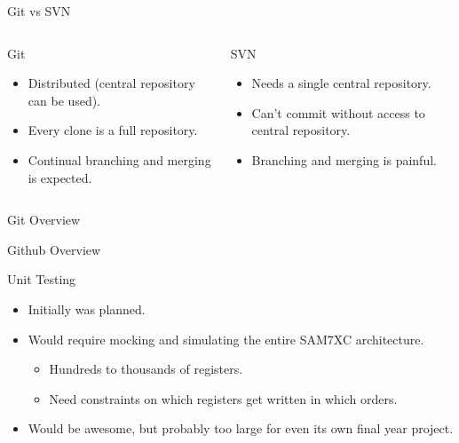 \documentclass[xcolor=dvipsnames]{beamer}
\begin{document}
    \begin{frame}{Git vs SVN}
      \begin{columns}
          \begin{block}{Git}
            \begin{itemize}
              \item Distributed (central repository can be used).
              \vspace{0.5\baselineskip}
              \item Every clone is a full repository.
              \vspace{0.5\baselineskip}
              \item Continual branching and merging is expected.
            \end{itemize}
          \end{block}

          \begin{block}{SVN}
            \begin{itemize}
              \item Needs a single central repository.
              \vspace{0.5\baselineskip}
              \item Can't commit without access to central repository.
              \vspace{0.5\baselineskip}
              \item Branching and merging is painful.
            \end{itemize}
          \end{block}
      \end{columns}
    \end{frame}

    \begin{frame}{Git Overview}
    \end{frame}

    \begin{frame}{Github Overview}
    \end{frame}

    \begin{frame}{Unit Testing}
      \begin{itemize}
        \item Initially was planned.
        \vspace{0.5\baselineskip}
        \item Would require mocking and simulating the entire SAM7XC architecture.
        \begin{itemize}
          \item Hundreds to thousands of registers.
          \item Need constraints on which registers get written in which orders.
        \end{itemize}
        \vspace{0.5\baselineskip}
        \item Would be awesome, but probably too large for even its own final year project.
      \end{itemize}
    \end{frame}
\end{document}
